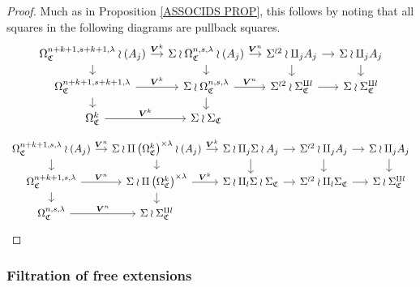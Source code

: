 \documentclass[a4paper,10pt
,draft
]{article}%
\numberwithin{equation}{section}
\numberwithin{figure}{section}
\theoremstyle{definition} %
\newcommand{\1}{\ensuremath{\mathbbm 1}}%
\newcommand{\OC}{\Omega_{\mathfrak C}}
\begin{document}
\begin{proof}
	Much as in Proposition \ref{ASSOCIDS PROP}, this follows by noting that all squares in the following diagrams are pullback squares.
\begin{equation}\label{LSTRINGS EQ}
\begin{tikzcd}[column sep = 11pt, row sep = 9pt]
	\OC^{n+k+1,s+k+1,\lambda} \arrow{r}{\boldsymbol{V}^k} \wr (A_j)
	\ar{d}
	&
	\Sigma \wr \OC^{n,s,\lambda} \wr (A_j) \ar{r}{\boldsymbol{V}^n} \ar{d}
	&
	\Sigma^{\wr 2} \wr \amalg_j A_j \arrow{r} \ar{d}
	&
	\Sigma \wr \amalg_j A_j \ar{d}
	\\
	\OC^{n+k+1,s+k+1,\lambda} \arrow{r}{\boldsymbol{V}^k} \arrow[d]
	&
	\Sigma \wr \OC^{n,s,\lambda} \arrow{r}{\boldsymbol{V}^n} \arrow[d]
	&
	\Sigma^{\wr 2} \wr \Sigma_{\mathfrak C}^{\amalg l} \ar{r}
	&
	\Sigma \wr \Sigma_{\mathfrak C}^{\amalg l}
	\\
	\OC^k \arrow{r}{\boldsymbol{V}^k}
	&
	\Sigma \wr \Sigma_{\mathfrak C}
	\end{tikzcd}
\end{equation}	
\begin{equation}
\begin{tikzcd}[column sep = 11pt, row sep = 9pt]
	\OC^{n+k+1,s,\lambda} \arrow{r}{\boldsymbol{V}^n} \wr (A_j)
	\ar{d}
	&
	\Sigma \wr \amalg \left(\OC^{k}\right)^{\times \lambda} \wr (A_j)
	\ar{r}{\boldsymbol{V}^k} \ar{d}
	&
	\Sigma \wr \amalg_j \Sigma \wr A_j \arrow{r} \ar{d}
	&
	\Sigma^{\wr 2} \wr \amalg_j A_j \arrow{r} \ar{d}
	&
	\Sigma \wr \amalg_j A_j \ar{d}
	\\
	\OC^{n+k+1,s,\lambda} \arrow{r}{\boldsymbol{V}^n} \arrow[d]
	&
	\Sigma \wr \amalg \left(\OC^{k}\right)^{\times \lambda} \arrow{r}{\boldsymbol{V}^k} \arrow[d]
	&
	\Sigma \wr \amalg_l \Sigma \wr \Sigma_{\mathfrak{C}} \ar{r}
	&
	\Sigma^{\wr 2} \wr \amalg_l \Sigma_{\mathfrak{C}} \ar{r}
	&
	\Sigma \wr \Sigma_{\mathfrak C}^{\amalg l}
	\\
	\OC^{n,s,\lambda} \arrow{r}{\boldsymbol{V}^n}
	&
	\Sigma \wr \Sigma_{\mathfrak C}^{\amalg l}
\end{tikzcd}
\end{equation}
\end{proof}





\subsubsection*{Filtration of free extensions}
\label{EQMON_SEC}
\end{document}
